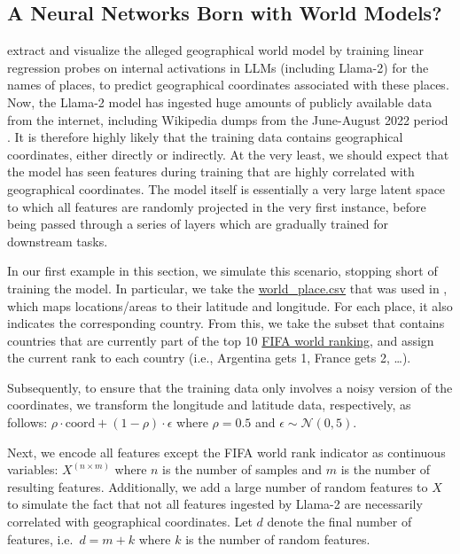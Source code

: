 \documentclass{article}
\theoremstyle{plain}
\theoremstyle{definition}
\theoremstyle{remark}
\begin{document}
\subsection{A Neural Networks Born with World Models?}\label{example-deep-learning}

\citet{gurnee2023languagev2} extract and visualize the alleged geographical world model by training linear regression probes on internal activations in LLMs (including Llama-2) for the names of places, to predict geographical coordinates associated with these places. Now, the Llama-2 model has ingested huge amounts of publicly available data from the internet, including Wikipedia dumps from the June-August 2022 period \citep{touvron2023llama}. It is therefore highly likely that the training data contains geographical coordinates, either directly or indirectly. At the very least, we should expect that the model has seen features during training that are highly correlated with geographical coordinates. The model itself is essentially a very large latent space to which all features are randomly projected in the very first instance, before being passed through a series of layers which are gradually trained for downstream tasks.

In our first example in this section, we simulate this scenario, stopping short of training the model. In particular, we take the \href{https://github.com/wesg52/world-models/blob/main/data/entity_datasets/world_place.csv}{world\_place.csv} that was used in \citet{gurnee2023languagev2}, which maps locations/areas to their latitude and longitude. For each place, it also indicates the corresponding country. From this, we take the subset that contains countries that are currently part of the top 10 \href{https://www.fifa.com/fifa-world-ranking/men?dateId=id14142}{FIFA world ranking}, and assign the current rank to each country (i.e., Argentina gets 1, France gets 2, \ldots{}).

Subsequently, to ensure that the training data only involves a noisy version of the coordinates, we transform the longitude and latitude data, respectively, as follows: \(\rho \cdot \text{coord} + (1-\rho) \cdot \epsilon\) where \(\rho=0.5\) and \(\epsilon \sim \mathcal{N}(0, 5)\).

Next, we encode all features except the FIFA world rank indicator as continuous variables: \(X^{(n \times m)}\) where \(n\) is the number of samples and \(m\) is the number of resulting features. Additionally, we add a large number of random features to \(X\) to simulate the fact that not all features ingested by Llama-2 are necessarily correlated with geographical coordinates. Let \(d\) denote the final number of features, i.e.~\(d=m+k\) where \(k\) is the number of random features.
\end{document}

